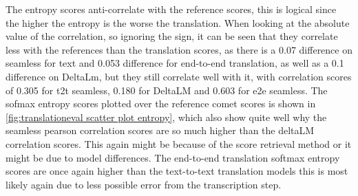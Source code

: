 The entropy scores anti-correlate with the reference scores, this is logical since the higher the entropy is the worse the translation. 
When looking at the absolute value of the correlation, so ignoring the sign, it can be seen that they correlate less with the references than the translation scores, as there is a 0.07 difference on seamless for text and 0.053 difference for end-to-end translation, as well as a 0.1 difference on DeltaLm, but they still correlate well with it, with correlation scores of 0.305 for t2t seamless, 0.180 for DeltaLM and 0.603 for e2e seamless.
The sofmax entropy scores plotted over the reference comet scores is shown in \autoref{fig:translationeval scatter plot entropy}, which also show quite well why the seamless pearson correlation scores are so much higher than the deltaLM correlation scores. This again might be because of the score retrieval method or it might be due to model differences. 
The end-to-end translation softmax entropy scores are once again higher than the text-to-text translation models this is most likely again due to less possible error from the transcription step.

